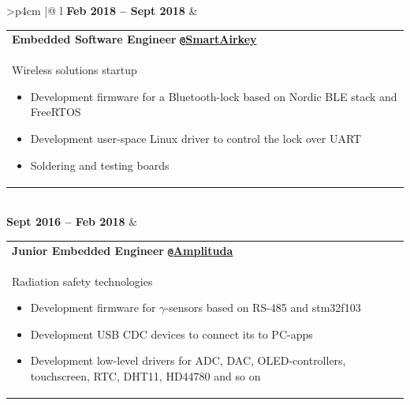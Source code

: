 \documentclass{anisyan-resume}
\begin{document}
\begin{tabularx}{\textwidth}{>{\quad}p{4cm} |@{\timelinebullet} l}
		\normalsize\textbf{Feb 2018 -- Sept 2018}
		&
		\renewcommand\arraystretch{1}
		\begin{tabular}[t]{ p{15cm} }
			\large{\textbf{Embedded Software Engineer}} \texttt{\textbf{@}}\href{https://smartairkey.com/en/}{\textbf{SmartAirkey}}\\
			\normalsize{Wireless solutions startup}
			\renewcommand\labelitemi{{\boldmath$\cdot$}}
			\begin{itemize}[noitemsep, topsep=5pt, parsep=0pt, partopsep=0pt]
				\item {\small Development firmware for a Bluetooth-lock based on Nordic BLE stack and FreeRTOS}
				\item {\small Development user-space Linux driver to control the lock over UART}
				\item {\small Soldering and testing boards}
			\end{itemize}
		\end{tabular} \\

		\normalsize\textbf{Sept 2016 -- Feb 2018}
		&
		\renewcommand\arraystretch{1}
		\begin{tabular}[t]{ p{15cm} }
			\large{\textbf{Junior Embedded Engineer}} \texttt{\textbf{@}}\href{http://www.amplituda.ru/}{\textbf{Amplituda}}\\
			\normalsize{Radiation safety technologies}
			\renewcommand\labelitemi{{\boldmath$\cdot$}}
			\begin{itemize}[noitemsep, topsep=5pt, parsep=0pt, partopsep=0pt]
				\item {\small Development firmware for $\gamma$-sensors based on RS-485 and stm32f103}
				\item {\small Development USB CDC devices to connect its to PC-apps}
				\item {\small Development low-level drivers for ADC, DAC, OLED-controllers, touchscreen, RTC, DHT11, HD44780 and so on}
			\end{itemize}
		\end{tabular}
	\end{tabularx}

\end{document}
